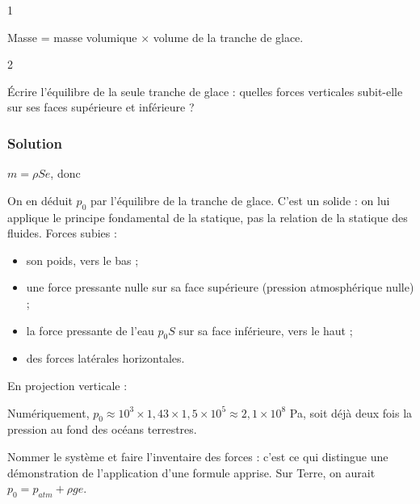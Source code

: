 \documentclass[11pt,a4paper]{article}
\providecommand{\tightlist}{\setlength{\itemsep}{0pt}\setlength{\parskip}{0pt}}
\newcommand{\equationajustee}[1]{%
  \sbox{\boiteequation}{$\displaystyle #1$}%
  \ifdim\wd\boiteequation>\linewidth
    \[\resizebox{\linewidth}{!}{\usebox{\boiteequation}}\]%
  \else
    \[#1\]%
  \fi}
\begin{document}
\begin{indication}{1}

Masse = masse volumique × volume de la tranche de glace.

\end{indication}

\begin{indication}{2}

Écrire l'équilibre de la seule tranche de glace : quelles forces verticales subit-elle sur ses faces supérieure et inférieure ?

\end{indication}

\hypertarget{solution-12}{%
\subsubsection{Solution}\label{solution-12}}

\(m = \rho S e\), donc

\equationajustee{\boxed{P = \rho\,S\,e\,g}}

On en déduit \(p_0\) par l'équilibre de la tranche de glace. C'est un solide : on lui applique le principe fondamental de la statique, pas la relation de la statique des fluides. Forces subies :

\begin{itemize}
\tightlist
\item
  son poids, vers le bas ;
\item
  une force pressante nulle sur sa face supérieure (pression atmosphérique nulle) ;
\item
  la force pressante de l'eau \(p_0 S\) sur sa face inférieure, vers le haut ;
\item
  des forces latérales horizontales.
\end{itemize}

En projection verticale :

\equationajustee{p_0 S - \rho S e g = 0}

\equationajustee{\boxed{p_0 = \rho\,g\,e}}

Numériquement, \(p_0 \approx 10^3 \times 1{,}43 \times 1{,}5\times10^5 \approx 2{,}1\times10^8\) Pa, soit déjà deux fois la pression au fond des océans terrestres.

\begin{methode}

Nommer le système et faire l'inventaire des forces : c'est ce qui distingue une démonstration de l'application d'une formule apprise. Sur Terre, on aurait \(p_0 = p_{atm} + \rho g e\).

\end{methode}
\end{document}

